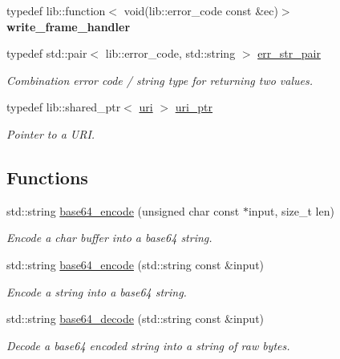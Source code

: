 \begin{DoxyCompactItemize}
\item 
typedef lib\+::function$<$ void(lib\+::error\+\_\+code const \&ec)$>$ {\bfseries write\+\_\+frame\+\_\+handler}\hypertarget{namespacewebsocketpp_aeb8dee2a5b6c4f1cac6755b206581216}{}\label{namespacewebsocketpp_aeb8dee2a5b6c4f1cac6755b206581216}

\item 
typedef std\+::pair$<$ lib\+::error\+\_\+code, std\+::string $>$ \hyperlink{namespacewebsocketpp_abecf95d53c9387716b157daae84441f3}{err\+\_\+str\+\_\+pair}\hypertarget{namespacewebsocketpp_abecf95d53c9387716b157daae84441f3}{}\label{namespacewebsocketpp_abecf95d53c9387716b157daae84441f3}

\begin{DoxyCompactList}\small\item\em Combination error code / string type for returning two values. \end{DoxyCompactList}\item 
typedef lib\+::shared\+\_\+ptr$<$ \hyperlink{classwebsocketpp_1_1uri}{uri} $>$ \hyperlink{namespacewebsocketpp_aae370ea5ac83a8ece7712cb39fc23f5b}{uri\+\_\+ptr}\hypertarget{namespacewebsocketpp_aae370ea5ac83a8ece7712cb39fc23f5b}{}\label{namespacewebsocketpp_aae370ea5ac83a8ece7712cb39fc23f5b}

\begin{DoxyCompactList}\small\item\em Pointer to a U\+RI. \end{DoxyCompactList}\end{DoxyCompactItemize}
\subsection*{Functions}
\begin{DoxyCompactItemize}
\item 
std\+::string \hyperlink{namespacewebsocketpp_aff36d40583424a2c879df02219133af8}{base64\+\_\+encode} (unsigned char const $\ast$input, size\+\_\+t len)
\begin{DoxyCompactList}\small\item\em Encode a char buffer into a base64 string. \end{DoxyCompactList}\item 
std\+::string \hyperlink{namespacewebsocketpp_a3a167489f63491475d0069204edf71da}{base64\+\_\+encode} (std\+::string const \&input)
\begin{DoxyCompactList}\small\item\em Encode a string into a base64 string. \end{DoxyCompactList}\item 
std\+::string \hyperlink{namespacewebsocketpp_a1467174a88a2f4037c45dbeb9d57c481}{base64\+\_\+decode} (std\+::string const \&input)
\begin{DoxyCompactList}\small\item\em Decode a base64 encoded string into a string of raw bytes. \end{DoxyCompactList}\end{DoxyCompactItemize}


